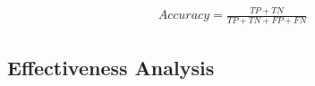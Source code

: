 \begin{eqnarray}
\label{eq:accuracy}
Accuracy = \frac{TP+TN}{TP+TN+FP+FN}
\end{eqnarray}

\subsection{Effectiveness Analysis}

{\color{red}{Tony, pliz show your exp graph and table here!!!}}
